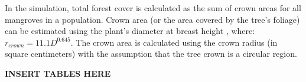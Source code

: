 In the simulation, total forest cover is calculated as the sum of crown areas for all mangroves in 
a population. Crown area (or the area covered by the tree's foliage) can be estimated using the
plant's diameter at breast height \cite{berger}, where: $r_{crown} = 11.1D^{0.645}$. The crown area is calculated using the crown radius (in square centimeters) with the assumption that the tree crown is a circular region.

\textbf{INSERT TABLES HERE}